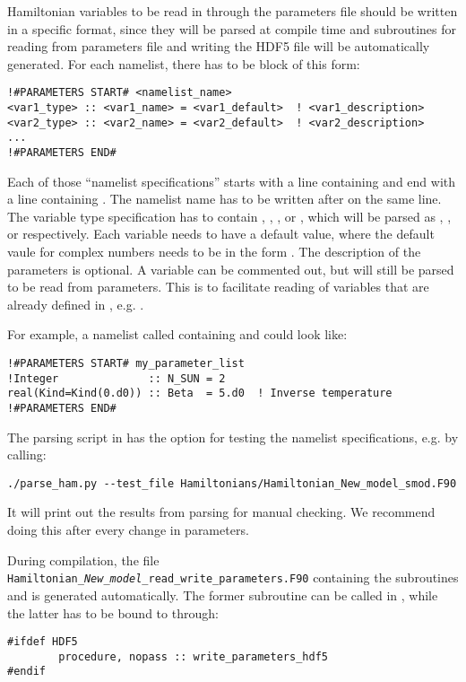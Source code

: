 Hamiltonian variables to be read in through the parameters file should be written in a specific format, since they will be parsed at compile time and subroutines for reading from parameters file and writing the HDF5 file will be automatically generated.
For each namelist, there has to be block of this form:
\begin{lstlisting}[style=fortran]
!#PARAMETERS START# <namelist_name>
<var1_type> :: <var1_name> = <var1_default>  ! <var1_description>
<var2_type> :: <var2_name> = <var2_default>  ! <var2_description>
...
!#PARAMETERS END#
\end{lstlisting}
Each of those ``namelist specifications'' starts with a line containing  and end with a line containing . The namelist name has to be written after  on the same line. The variable type specification  has to contain , , ,  or , which will be parsed as , ,  or  respectively. Each variable needs to have a default value, where the default vaule for complex numbers needs to be in the form . The description of the parameters is optional. A variable can be commented out, but will still be parsed to be read from parameters. This is to facilitate reading of variables that are already defined in , e.g. .

For example, a namelist called  containing  and  could look like:
\begin{lstlisting}[style=fortran]
!#PARAMETERS START# my_parameter_list
!Integer              :: N_SUN = 2
real(Kind=Kind(0.d0)) :: Beta  = 5.d0  ! Inverse temperature
!#PARAMETERS END#
\end{lstlisting}
The parsing script  in  has the option  for testing the namelist specifications, e.g. by calling:
\begin{lstlisting}[style=bash]
./parse_ham.py --test_file Hamiltonians/Hamiltonian_New_model_smod.F90
\end{lstlisting}
It will print out the results from parsing for manual checking. We recommend doing this after every change in parameters.

During compilation, the file \texttt{Hamiltonian\_\emph{New\_model}\_read\_write\_parameters.F90} containing the subroutines  and  is generated automatically. The former subroutine can be called in , while the latter has to be bound to  through:
\begin{lstlisting}[style=fortran]
#ifdef HDF5
        procedure, nopass :: write_parameters_hdf5
#endif
\end{lstlisting}

